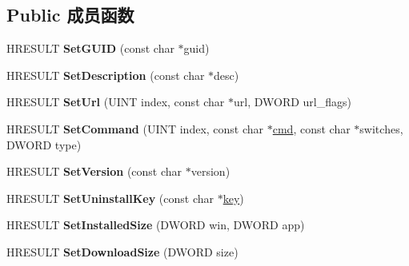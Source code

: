 \subsection*{Public 成员函数}
\begin{DoxyCompactItemize}
\item 
\mbox{\label{interface_i_cif_r_w_component_a273308e714851656db674fe0537e5544}} 
H\+R\+E\+S\+U\+LT {\bfseries Set\+G\+U\+ID} (const char $\ast$guid)
\item 
\mbox{\label{interface_i_cif_r_w_component_a82ed9f35ddc505e455d0a13b16a69d45}} 
H\+R\+E\+S\+U\+LT {\bfseries Set\+Description} (const char $\ast$desc)
\item 
\mbox{\label{interface_i_cif_r_w_component_adc2b1776638f7cd90698599c5b870e7e}} 
H\+R\+E\+S\+U\+LT {\bfseries Set\+Url} (U\+I\+NT index, const char $\ast$url, D\+W\+O\+RD url\+\_\+flags)
\item 
\mbox{\label{interface_i_cif_r_w_component_a516649ea8065bf701cd60e808b86b7a5}} 
H\+R\+E\+S\+U\+LT {\bfseries Set\+Command} (U\+I\+NT index, const char $\ast$\hyperlink{structcmd}{cmd}, const char $\ast$switches, D\+W\+O\+RD type)
\item 
\mbox{\label{interface_i_cif_r_w_component_a23c4f9d7460a7e60b5d2e78b2d9de777}} 
H\+R\+E\+S\+U\+LT {\bfseries Set\+Version} (const char $\ast$version)
\item 
\mbox{\label{interface_i_cif_r_w_component_a69d293c249b1b1e715333242501563c9}} 
H\+R\+E\+S\+U\+LT {\bfseries Set\+Uninstall\+Key} (const char $\ast$\hyperlink{structkey}{key})
\item 
\mbox{\label{interface_i_cif_r_w_component_afc2b0e5dbcacbf42baa129075a714089}} 
H\+R\+E\+S\+U\+LT {\bfseries Set\+Installed\+Size} (D\+W\+O\+RD win, D\+W\+O\+RD app)
\item 
\mbox{\label{interface_i_cif_r_w_component_abbe68330430c2e3df2bf0920ee49002a}} 
H\+R\+E\+S\+U\+LT {\bfseries Set\+Download\+Size} (D\+W\+O\+RD size)

\end{DoxyCompactItemize}
